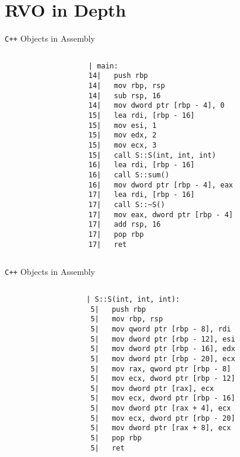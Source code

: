 \section{RVO in Depth}

\begin{frame}
    \centering
    \scalebox{3}{RVO in Depth}
\end{frame}

\begin{frame}[fragile]{\texttt{C++} Objects in Assembly}
    \begin{columns}[t]
        \begin{column}{.45\textwidth}
        \end{column}
        \begin{column}{.45\textwidth}
            \begin{lstlisting}[language={},morekeywords={rdi},numbers=none]
  | main:
14|   push rbp
14|   mov rbp, rsp
14|   sub rsp, 16
14|   mov dword ptr [rbp - 4], 0
15|   lea rdi, [rbp - 16]
15|   mov esi, 1
15|   mov edx, 2
15|   mov ecx, 3
15|   call S::S(int, int, int)
16|   lea rdi, [rbp - 16]
16|   call S::sum()
16|   mov dword ptr [rbp - 4], eax
17|   lea rdi, [rbp - 16]
17|   call S::~S()
17|   mov eax, dword ptr [rbp - 4]
17|   add rsp, 16
17|   pop rbp
17|   ret
            \end{lstlisting}
        \end{column}
    \end{columns}
\end{frame}

\begin{frame}[fragile]{\texttt{C++} Objects in Assembly}
    \begin{columns}[t]
        \begin{column}{.45\textwidth}
        \end{column}
        \begin{column}{.45\textwidth}
            \begin{lstlisting}[language={},morekeywords={rdi},numbers=none]
  | S::S(int, int, int):
 5|   push rbp
 5|   mov rbp, rsp
 5|   mov qword ptr [rbp - 8], rdi
 5|   mov dword ptr [rbp - 12], esi
 5|   mov dword ptr [rbp - 16], edx
 5|   mov dword ptr [rbp - 20], ecx
 5|   mov rax, qword ptr [rbp - 8]
 5|   mov ecx, dword ptr [rbp - 12]
 5|   mov dword ptr [rax], ecx
 5|   mov ecx, dword ptr [rbp - 16]
 5|   mov dword ptr [rax + 4], ecx
 5|   mov ecx, dword ptr [rbp - 20]
 5|   mov dword ptr [rax + 8], ecx
 5|   pop rbp
 5|   ret
            \end{lstlisting}
        \end{column}
    \end{columns}
\end{frame}


